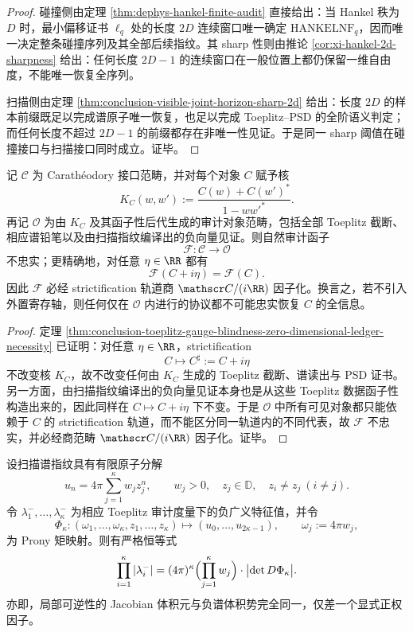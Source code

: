 \begin{proof}
碰撞侧由定理 \ref{thm:dephys-hankel-finite-audit} 直接给出：当 Hankel 秩为 \(D\) 时，最小偏移证书 \(\ell_q\) 处的长度 \(2D\) 连续窗口唯一确定 \(\mathrm{HANKELNF}_q\)，因而唯一决定整条碰撞序列及其全部后续指纹。其 sharp 性则由推论 \ref{cor:xi-hankel-2d-sharpness} 给出：任何长度 \(2D-1\) 的连续窗口在一般位置上都仍保留一维自由度，不能唯一恢复全序列。

扫描侧由定理 \ref{thm:conclusion-visible-joint-horizon-sharp-2d} 给出：长度 \(2D\) 的样本前缀既足以完成谱原子唯一恢复，也足以完成 Toeplitz--PSD 的全阶语义判定；而任何长度不超过 \(2D-1\) 的前缀都存在非唯一性见证。于是同一 sharp 阈值在碰撞接口与扫描接口同时成立。证毕。
\end{proof}

\begin{theorem}\label{thm:conclusion-toeplitz-scan-audit-functor-nonfaithful}
记 \(\mathscr C\) 为 Carath\'eodory 接口范畴，并对每个对象 \(C\) 赋予核
\[
K_C(w,w'):=\frac{C(w)+C(w')^\ast}{1-ww'^\ast}.
\]
再记 \(\mathscr O\) 为由 \(K_C\) 及其函子性后代生成的审计对象范畴，包括全部 Toeplitz 截断、相应谱铅笔以及由扫描指纹编译出的负向量见证。则自然审计函子
\[
\mathcal F:\mathscr C\longrightarrow \mathscr O
\]
不忠实；更精确地，对任意 \(\eta\in\RR\) 都有
\[
\mathcal F(C+i\eta)=\mathcal F(C).
\]
因此 \(\mathcal F\) 必经 strictification 轨道商 \(\mathscr C/(i\RR)\) 因子化。换言之，若不引入外置寄存轴，则任何仅在 \(\mathscr O\) 内进行的协议都不可能忠实恢复 \(C\) 的全信息。
\end{theorem}

\begin{proof}
定理 \ref{thm:conclusion-toeplitz-gauge-blindness-zero-dimensional-ledger-necessity} 已证明：对任意 \(\eta\in\RR\)，strictification
\[
C\longmapsto C^\sharp:=C+i\eta
\]
不改变核 \(K_C\)，故不改变任何由 \(K_C\) 生成的 Toeplitz 截断、谱读出与 PSD 证书。另一方面，由扫描指纹编译出的负向量见证本身也是从这些 Toeplitz 数据函子性构造出来的，因此同样在 \(C\mapsto C+i\eta\) 下不变。于是 \(\mathscr O\) 中所有可见对象都只能依赖于 \(C\) 的 strictification 轨道，而不能区分同一轨道内的不同代表，故 \(\mathcal F\) 不忠实，并必经商范畴 \(\mathscr C/(i\RR)\) 因子化。证毕。
\end{proof}

\begin{theorem}\label{thm:conclusion-prony-jacobian-negative-spectrum-volume-identity}
设扫描谱指纹具有有限原子分解
\[
u_n=4\pi\sum_{j=1}^{\kappa} w_j z_j^n,
\qquad
w_j>0,\quad z_j\in\mathbb D,\quad z_i\neq z_j\ (i\neq j).
\]
令 \(\lambda_1^-,\dots,\lambda_\kappa^-\) 为相应 Toeplitz 审计度量下的负广义特征值，并令
\[
\Phi_\kappa:(\omega_1,\dots,\omega_\kappa,z_1,\dots,z_\kappa)\longmapsto (u_0,\dots,u_{2\kappa-1}),
\qquad
\omega_j:=4\pi w_j,
\]
为 Prony 矩映射。则有严格恒等式
\[
\prod_{i=1}^{\kappa}|\lambda_i^-|
=(4\pi)^\kappa\Bigl(\prod_{j=1}^{\kappa}w_j\Bigr)\cdot \bigl|\det D\Phi_\kappa\bigr|.
\]
亦即，局部可逆性的 Jacobian 体积元与负谱体积势完全同一，仅差一个显式正权因子。
\end{theorem}

